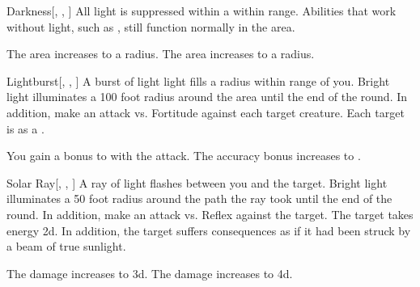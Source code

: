 \lowercase{\hypertarget{spell:Darkness}{}}\label{spell:Darkness}
\begin{freeability}[Rank 4]{\hypertarget{spell:Darkness}{Darkness}}[, , ]
\targetrule
All light is suppressed within a \areamed {} within \rngmed range.
Abilities that work without light, such as , still function normally in the area.

\rankline
{} The area increases to a \arealarge radius.
 The area increases to a \areahuge radius.
\end{freeability}
\vspace{0.25em}



\lowercase{\hypertarget{spell:Lightburst}{}}\label{spell:Lightburst}
\begin{freeability}[Rank 4]{\hypertarget{spell:Lightburst}{Lightburst}}[, , ]
A burst of light light fills a \areasmall radius  within \rngmed range of you.
Bright light illuminates a 100 foot radius around the area until the end of the round.
In addition, make an attack vs. Fortitude against each target creature.
\hit Each target is \dazzled as a .

\rankline
{} You gain a  bonus to  with the attack.
 The accuracy bonus increases to .
\end{freeability}
\vspace{0.25em}



\lowercase{\hypertarget{spell:Solar Ray}{}}\label{spell:Solar Ray}
\begin{freeability}[Rank 4]{\hypertarget{spell:Solar Ray}{Solar Ray}}[, , ]
A ray of light flashes between you and the target.
Bright light illuminates a 50 foot radius around the path the ray took until the end of the round.
In addition, make an attack vs. Reflex against the target.
\hit The target takes energy  \plus2d.
In addition, the target suffers consequences as if it had been struck by a beam of true sunlight.

\rankline
{} The damage increases to  \plus3d.
 The damage increases to  \plus4d.
\end{freeability}
\vspace{0.25em}



